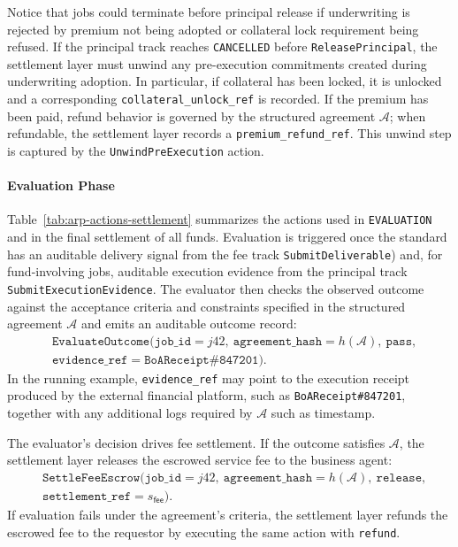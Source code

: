 \documentclass{article} %
\begin{document}
Notice that jobs could terminate before principal release if underwriting is rejected by premium not being adopted or collateral lock requirement being refused. If the principal track reaches \texttt{CANCELLED} before \texttt{ReleasePrincipal}, the settlement layer must unwind any pre-execution commitments created during underwriting adoption. In particular, if collateral has been locked, it is unlocked and a corresponding \texttt{collateral\_unlock\_ref} is recorded. If the premium has been paid, refund behavior is governed by the structured agreement $\mathcal{A}$; when refundable, the settlement layer records a \texttt{premium\_refund\_ref}. This unwind step is captured by the \texttt{UnwindPreExecution} action.





\paragraph{Evaluation Phase}
Table~\ref{tab:arp-actions-settlement} summarizes the actions used in \texttt{EVALUATION} and in the final settlement of all funds. Evaluation is triggered once the standard has an auditable delivery signal from the fee track \texttt{SubmitDeliverable}) and, for fund-involving jobs, auditable execution evidence from the principal track \texttt{SubmitExecutionEvidence}. The evaluator then checks the observed outcome against the acceptance criteria and constraints specified in the structured agreement $\mathcal{A}$ and emits an auditable outcome record:
\[
\begin{aligned}
&\texttt{EvaluateOutcome}(\texttt{job\_id}=j42,\ \texttt{agreement\_hash}=h(\mathcal{A}),\ \texttt{pass},\\ &\texttt{evidence\_ref}=\texttt{BoAReceipt\#847201}).
\end{aligned}
\]
In the running example, \texttt{evidence\_ref} may point to the execution receipt produced by the external financial platform, such as \texttt{BoAReceipt\#847201}, together with any additional logs required by $\mathcal{A}$ such as timestamp.

The evaluator's decision drives fee settlement. If the outcome satisfies $\mathcal{A}$, the settlement layer releases the escrowed service fee to the business agent:
\[
\begin{aligned}
&\texttt{SettleFeeEscrow}(\texttt{job\_id}=j42,\ \texttt{agreement\_hash}=h(\mathcal{A}),\ \texttt{release},\\ &\texttt{settlement\_ref}=s_{\textsf{fee}}).
\end{aligned}
\]
If evaluation fails under the agreement's criteria, the settlement layer refunds the escrowed fee to the requestor by executing the same action with \texttt{refund}.
\end{document}
